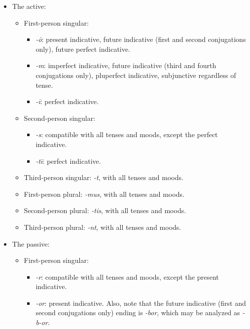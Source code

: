 \documentclass{article}
\newcommand*{\corpus}[1]{\emph{#1}}
\begin{document}
\begin{itemize}
    \item The active:
    \begin{itemize}
        \item First-person singular: 
        \begin{itemize}
            \item \corpus{-\={o}}: present indicative, 
            future indicative (first and second conjugations only), 
            future perfect indicative.
            \item \corpus{-m}: imperfect indicative, 
            future indicative (third and fourth conjugations only),
            pluperfect indicative,
            subjunctive regardless of tense.
            \item \corpus{-ī}: perfect indicative.
        \end{itemize}
        \item Second-person singular:
        \begin{itemize}
            \item \corpus{-s}: compatible with all tenses and moods, except the perfect indicative.
            \item \corpus{-tī}: perfect indicative.
        \end{itemize}
        \item Third-person singular: \corpus{-t}, with all tenses and moods.
        \item First-person plural: \corpus{-mus}, with all tenses and moods.
        \item Second-person plural: \corpus{-tis}, with all tenses and moods.
        \item Third-person plural: \corpus{-nt}, with all tenses and moods.
    \end{itemize}
    \item The passive:
    \begin{itemize}
        \item First-person singular: 
        \begin{itemize}
            \item \corpus{-r}: compatible with all tenses and moods, except the present indicative.
            \item \corpus{-or}: present indicative.
            Also, note that the future indicative (first and second conjugations only) ending is \corpus{-bor},
            which may be analyzed as \corpus{-b-or}.
        \end{itemize}

\end{itemize}
\end{itemize}
\end{document}
